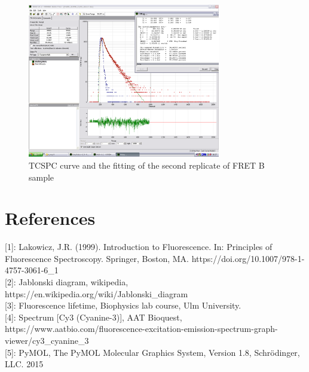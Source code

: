 \documentclass[a4paper,english,12pt,bibliography=totoc]{scrreprt}
\begin{document}
\begin{figure}
    \centering
    \includegraphics[width=0.75\textwidth]{images/FRET/FretB_dsDNA_Cy3B_data2_fit2.png}
    \caption{TCSPC curve and the fitting of the second replicate of FRET B sample}
    \label{FretB_dsDNA_Cy3B_data2_fit2}
\end{figure}


\chapter{References}
\label{cha:References}

[1]\label{sec:ref_1}: Lakowicz, J.R. (1999). Introduction to Fluorescence. In: Principles of Fluorescence Spectroscopy. Springer, Boston, MA. https://doi.org/10.1007/978-1-4757-3061-6\_1\\

[2]\label{sec:ref_2}: Jablonski diagram, wikipedia, https://en.wikipedia.org/wiki/Jablonski\_diagram\\

[3]\label{sec:ref_3}: Fluorescence lifetime, Biophysics lab course, Ulm University.\\

[4]\label{sec:ref_4}: Spectrum [Cy3 (Cyanine-3)], AAT Bioquest, https://www.aatbio.com/fluorescence-excitation-emission-spectrum-graph-viewer/cy3\_cyanine\_3\\

[5]\label{sec:ref_5}: PyMOL, The PyMOL Molecular Graphics System, Version 1.8, Schr{\"o}dinger, LLC. 2015
\end{document}
